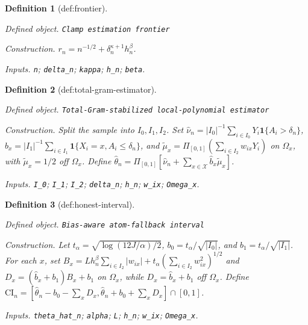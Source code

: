\documentclass{article}
\newtheorem{definition}{Definition}
\begin{document}
\begin{definition}[def:frontier]\label{def:frontier}
\par\smallskip\noindent\emph{Defined object.} \texttt{Clamp estimation frontier}
\par\smallskip\noindent\emph{Construction.} \(r_n=n^{-1/2}+\delta_n^{\kappa+1}h_n^\beta\).
\par\smallskip\noindent\emph{Inputs.} \texttt{n}; \texttt{delta\_\allowbreak{}n}; \texttt{kappa}; \texttt{h\_\allowbreak{}n}; \texttt{beta}.
\end{definition}

\begin{definition}[def:total-gram-estimator]\label{def:total-gram-estimator}
\par\smallskip\noindent\emph{Defined object.} \texttt{Total-\allowbreak{}Gram-\allowbreak{}stabilized local-\allowbreak{}polynomial estimator}
\par\smallskip\noindent\emph{Construction.} Split the sample into \(I_0,I_1,I_2\). Set \(\widehat\nu_n=|I_0|^{-1}\sum_{i\in I_0}Y_i\mathbf 1\{A_i>\delta_n\}\), \(\widehat b_x=|I_1|^{-1}\sum_{i\in I_1}\mathbf 1\{X_i=x,A_i\leq\delta_n\}\), and \(\widetilde\mu_x=\Pi_{[0,1]}(\sum_{i\in I_2}w_{ix}Y_i)\) on \(\Omega_x\), with \(\widetilde\mu_x=1/2\) off \(\Omega_x\). Define \(\widehat\theta_n=\Pi_{[0,1]}[\widehat\nu_n+\sum_{x\in\mathcal X}\widehat b_x\widetilde\mu_x]\).
\par\smallskip\noindent\emph{Inputs.} \texttt{I\_\allowbreak{}0}; \texttt{I\_\allowbreak{}1}; \texttt{I\_\allowbreak{}2}; \texttt{delta\_\allowbreak{}n}; \texttt{h\_\allowbreak{}n}; \texttt{w\_\allowbreak{}ix}; \texttt{Omega\_\allowbreak{}x}.
\end{definition}

\begin{definition}[def:honest-interval]\label{def:honest-interval}
\par\smallskip\noindent\emph{Defined object.} \texttt{Bias-\allowbreak{}aware atom-\allowbreak{}fallback interval}
\par\smallskip\noindent\emph{Construction.} Let \(t_\alpha=\sqrt{\log(12J/\alpha)/2}\), \(b_0=t_\alpha/\sqrt{|I_0|}\), and \(b_1=t_\alpha/\sqrt{|I_1|}\). For each \(x\), set \(B_x=Lh_n^\beta\sum_{i\in I_2}|w_{ix}|+t_\alpha(\sum_{i\in I_2}w_{ix}^2)^{1/2}\) and \(D_x=(\widehat b_x+b_1)B_x+b_1\) on \(\Omega_x\), while \(D_x=\widehat b_x+b_1\) off \(\Omega_x\). Define \(\mathrm{CI}_n=[\widehat\theta_n-b_0-\sum_xD_x,\widehat\theta_n+b_0+\sum_xD_x]\cap[0,1]\).
\par\smallskip\noindent\emph{Inputs.} \texttt{theta\_\allowbreak{}hat\_\allowbreak{}n}; \texttt{alpha}; \texttt{L}; \texttt{h\_\allowbreak{}n}; \texttt{w\_\allowbreak{}ix}; \texttt{Omega\_\allowbreak{}x}.
\end{definition}
\end{document}

